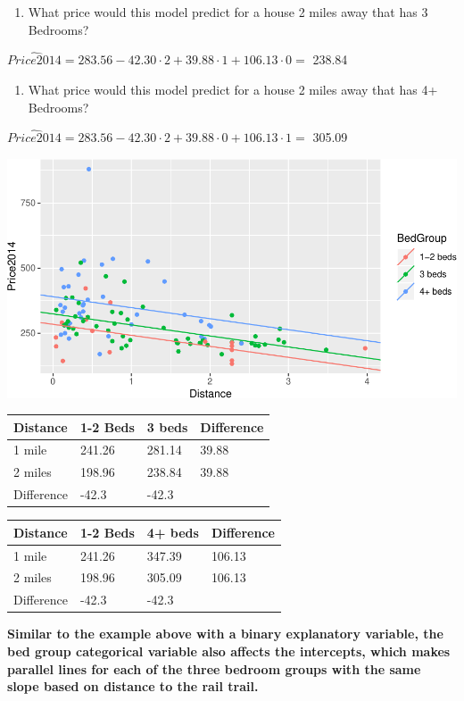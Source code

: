 \documentclass[]{article}
\providecommand{\tightlist}{%
  \setlength{\itemsep}{0pt}\setlength{\parskip}{0pt}}
\begin{document}
\begin{enumerate}
\def\labelenumi{\arabic{enumi}.}
\setcounter{enumi}{8}
\tightlist
\item
  What price would this model predict for a house 2 miles away that has
  3 Bedrooms?
\end{enumerate}

\(\widehat{Price2014} =283.56 - 42.30 \cdot 2 + 39.88 \cdot 1 + 106.13 \cdot 0 =\)
238.84

\begin{enumerate}
\def\labelenumi{\arabic{enumi}.}
\setcounter{enumi}{9}
\tightlist
\item
  What price would this model predict for a house 2 miles away that has
  4+ Bedrooms?
\end{enumerate}

\(\widehat{Price2014} = 283.56 - 42.30 \cdot 2 + 39.88 \cdot 0 + 106.13 \cdot 1 =\)
305.09

\includegraphics{09_InClass_Answers_files/figure-latex/unnamed-chunk-16-1.pdf}

\begin{longtable}[]{@{}llll@{}}
\toprule
Distance & 1-2 Beds & 3 beds & Difference\tabularnewline
\midrule
\endhead
1 mile & 241.26 & 281.14 & 39.88\tabularnewline
2 miles & 198.96 & 238.84 & 39.88\tabularnewline
Difference & -42.3 & -42.3 &\tabularnewline
\bottomrule
\end{longtable}

\begin{longtable}[]{@{}llll@{}}
\toprule
Distance & 1-2 Beds & 4+ beds & Difference\tabularnewline
\midrule
\endhead
1 mile & 241.26 & 347.39 & 106.13\tabularnewline
2 miles & 198.96 & 305.09 & 106.13\tabularnewline
Difference & -42.3 & -42.3 &\tabularnewline
\bottomrule
\end{longtable}

\textbf{Similar to the example above with a binary explanatory variable,
the bed group categorical variable also affects the intercepts, which
makes parallel lines for each of the three bedroom groups with the same
slope based on distance to the rail trail.}
\end{document}

